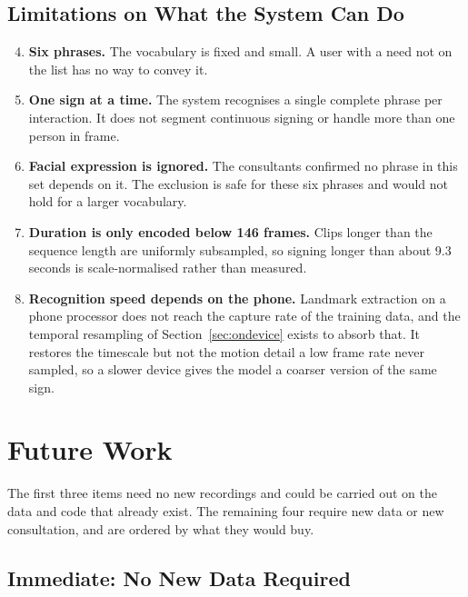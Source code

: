 \subsection{Limitations on What the System Can Do}

\begin{enumerate}
    \setcounter{enumi}{3}
    \item \textbf{Six phrases.} The vocabulary is fixed and small. A user with a need not on the list has no way to convey it.

    \item \textbf{One sign at a time.} The system recognises a single complete phrase per interaction. It does not segment continuous signing or handle more than one person in frame.

    \item \textbf{Facial expression is ignored.} The consultants confirmed no phrase in this set depends on it. The exclusion is safe for these six phrases and would not hold for a larger vocabulary.

    \item \textbf{Duration is only encoded below 146 frames.} Clips longer than the sequence length are uniformly subsampled, so signing longer than about 9.3 seconds is scale-normalised rather than measured.

    \item \textbf{Recognition speed depends on the phone.} Landmark extraction on a phone processor does not reach the capture rate of the training data, and the temporal resampling of Section~\ref{sec:ondevice} exists to absorb that. It restores the timescale but not the motion detail a low frame rate never sampled, so a slower device gives the model a coarser version of the same sign.
\end{enumerate}

\section{Future Work}

The first three items need no new recordings and could be carried out on the data and code that already exist. The remaining four require new data or new consultation, and are ordered by what they would buy.

\subsection{Immediate: No New Data Required}

